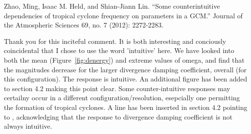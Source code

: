 \documentclass[11pt]{article}
\begin{document}
\begin{itemize}
{{Zhao, Ming, Isaac M. Held, and Shian-Jiann Lin. ``Some counterintuitive dependencies of tropical cyclone frequency on parameters in a GCM.'' Journal of the Atmospheric Sciences 69, no. 7 (2012): 2272-2283.}}

Thank you for this inciteful comment. It is both interesting and conciously coincidental that I chose to use the word 'intuitive' here. We have looked into both the mean (Figure~\ref{fig:denergy}) and extreme values of omega, and find that the magnitudes decrease for the larger divergence damping coefficient, overall (for this configuration). The response is intuitive. An additional figure has been added to section 4.2 making this point clear. Some counter-intuitive responses may certailny occur in a different configuration/resolution, esepcially one permitting the formation of tropical cyclones. A line has been inserted in section 4.2 pointing to \cite{ZHL2012JAS}, acknowledging that the response to divergence damping coefficient is not always intuitive.


\end{itemize}
\end{document}

